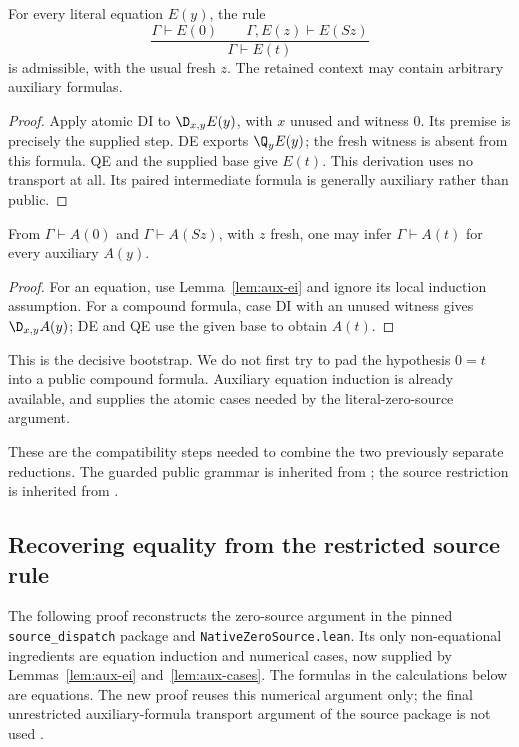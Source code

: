 \begin{lemma}\label{lem:aux-ei}
For every literal equation $E(y)$, the rule
\[
 \frac{\Gamma\vdash E(0)\qquad
       \Gamma,E(z)\vdash E(Sz)}
      {\Gamma\vdash E(t)}
\]
is admissible, with the usual fresh $z$.  The retained context may contain
arbitrary auxiliary formulas.
\end{lemma}
\begin{proof}
Apply atomic DI to $\D_{x,y}E(y)$, with $x$ unused and witness $0$.
Its premise is precisely the supplied step.  DE exports $\Q_yE(y)$;
the fresh witness is absent from this formula.  QE and the supplied base
give $E(t)$.  This derivation uses no transport at all.  Its paired
intermediate formula is generally auxiliary rather than public.
\end{proof}

\begin{lemma}\label{lem:aux-cases}
From $\Gamma\vdash A(0)$ and $\Gamma\vdash A(Sz)$, with $z$ fresh,
one may infer $\Gamma\vdash A(t)$ for every auxiliary $A(y)$.
\end{lemma}
\begin{proof}
For an equation, use Lemma~\ref{lem:aux-ei} and ignore its local induction
assumption.  For a compound formula, case DI with an unused witness
gives $\D_{x,y}A(y)$; DE and QE use the given base to obtain $A(t)$.
\end{proof}

This is the decisive bootstrap.  We do not first try to pad the hypothesis
$0=t$ into a public compound formula.  Auxiliary equation induction is
already available, and supplies the atomic cases needed by the
literal-zero-source argument.

These are the compatibility steps needed to combine the two previously
separate reductions.  The guarded public grammar is inherited from
\cite{guarded}; the source restriction is inherited from \cite{source}.

\subsection{Recovering equality from the restricted source rule}

The following proof reconstructs the zero-source argument in the pinned
\texttt{source\_dispatch} package and
\texttt{NativeZeroSource.lean}.  Its only non-equational ingredients are
equation induction and numerical cases, now supplied by
Lemmas~\ref{lem:aux-ei} and~\ref{lem:aux-cases}.  The formulas in the
calculations below are equations.
The new proof reuses this numerical argument only; the final unrestricted
auxiliary-formula transport argument of the source package is not used
\cite{source,lean-zero}.


